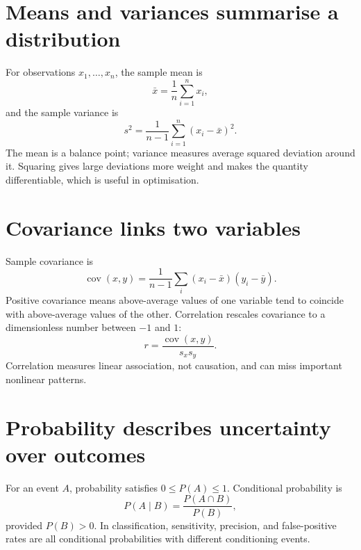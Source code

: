 \section{Means and variances summarise a distribution}
For observations $x_1,\ldots,x_n$, the sample mean is
\[
\bar{x}=\frac{1}{n}\sum_{i=1}^{n}x_i,
\]
and the sample variance is
\[
s^2=\frac{1}{n-1}\sum_{i=1}^{n}(x_i-\bar{x})^2.
\]
The mean is a balance point; variance measures average squared deviation around it. Squaring gives large deviations more weight and makes the quantity differentiable, which is useful in optimisation.

\section{Covariance links two variables}
Sample covariance is
\[
\operatorname{cov}(x,y)=\frac{1}{n-1}\sum_i(x_i-\bar{x})(y_i-\bar{y}).
\]
Positive covariance means above-average values of one variable tend to coincide with above-average values of the other. Correlation rescales covariance to a dimensionless number between $-1$ and $1$:
\[
r=\frac{\operatorname{cov}(x,y)}{s_xs_y}.
\]
Correlation measures linear association, not causation, and can miss important nonlinear patterns.

\section{Probability describes uncertainty over outcomes}
For an event $A$, probability satisfies $0\le P(A)\le1$. Conditional probability is
\[
P(A\mid B)=\frac{P(A\cap B)}{P(B)},
\]
provided $P(B)>0$. In classification, sensitivity, precision, and false-positive rates are all conditional probabilities with different conditioning events.

